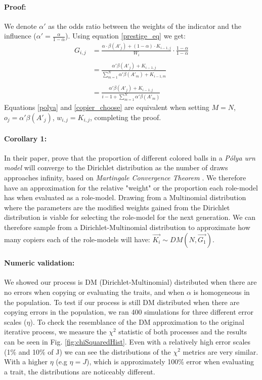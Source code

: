 \documentclass[11pt]{article}
\begin{document}
\paragraph{Proof:} 
We denote $\alpha'$ as the odds ratio between the weights of the indicator and the influence ($\alpha'=\frac{\alpha}{1-\alpha}$). 
Using equation \ref{prestige_eq} we get:
\begin{equation}\label{copier_choose}
\begin{split}
G_{i,j} & = \frac{\alpha\cdot \beta(A'_j) + (1-\alpha) \cdot K_{i-1,j}}{W_i} \cdot \frac{1-\alpha}{1-\alpha} \\\\
&= \frac{\alpha'\beta(A'_j) + K_{i-1,j}}{\sum\limits_{m=1}^{N} \alpha'\beta(A'_m) + K_{i-1,m}}\\\\
& =\frac{\alpha'\beta(A'_j) + K_{i-1,j}}{i-1 + \sum\limits_{m=1}^{N} \alpha'\beta(A'_m)}
\end{split}
\end{equation}
Equations \ref{polya} and \ref{copier_choose} are equivalent when setting $M=N$, $o_j = \alpha'\beta(A'_j)$, $w_{i,j} = K_{i,j}$, completing the proof.

\paragraph{Corollary 1:}
In their paper, \citet[section 2]{dirichlet} prove that the proportion of different colored balls in a \textit{Pólya urn model} will converge to the Dirichlet distribution as the number of draws approaches infinity, based on \textit{Martingale Convergence Theorem} \citep{martingaleBook}.
We therefore have an approximation for the relative "weight" or the proportion each role-model has when evaluated as a role-model. Drawing from a Multinomial distribution where the parameters are the modified weights gained from the Dirichlet distribution is viable for selecting the role-model for the next generation.
We can therefore sample from a Dirichlet-Multinomial distribution to approximate how many copiers each of the role-models will have:
$\vec{K_i} \sim DM(N,\vec{G_1})$.

\paragraph{Numeric validation:} We showed our process is DM (Dirichlet-Multinomial) distributed when there are no errors when copying or evaluating the traits, and when $\alpha$ is homogeneous in the population. To test if our process is still DM distributed when there are copying errors in the population, we ran 400 simulations for three different error scales ($\eta$). To check the resemblance of the DM approximation to the original iterative process, we measure the $\chi^2$ statistic of both processes and the results can be seen in Fig. \ref{fig:chiSquaredHist}.
Even with a relatively high error scales (1\% and 10\% of J) we can see the distributions of the $\chi^2$ metrics are very similar.
With a higher $\eta$ (e.g $\eta=J$), which is approximately 100\% error when evaluating a trait, the distributions are noticeably different.
\end{document}
